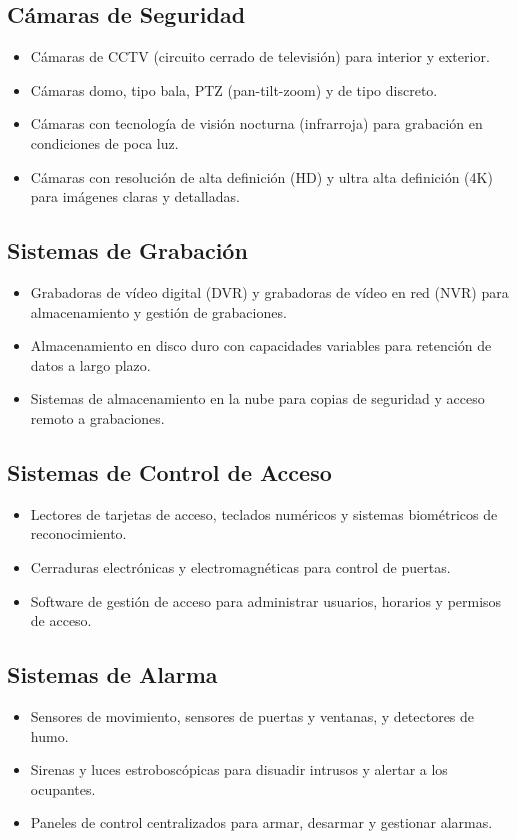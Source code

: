 \documentclass{report}
\begin{document}
          \subsection{Cámaras de Seguridad}
            \begin{itemize}
              \item Cámaras de CCTV (circuito cerrado de televisión) para interior y exterior.
              \item Cámaras domo, tipo bala, PTZ (pan-tilt-zoom) y de tipo discreto.
              \item Cámaras con tecnología de visión nocturna (infrarroja) para grabación en condiciones de poca luz.
              \item Cámaras con resolución de alta definición (HD) y ultra alta definición (4K) para imágenes claras y detalladas.
            \end{itemize}
          \subsection{Sistemas de Grabación}
            \begin{itemize}
              \item Grabadoras de vídeo digital (DVR) y grabadoras de vídeo en red (NVR) para almacenamiento y gestión de grabaciones.
              \item Almacenamiento en disco duro con capacidades variables para retención de datos a largo plazo.
              \item Sistemas de almacenamiento en la nube para copias de seguridad y acceso remoto a grabaciones.
            \end{itemize}
          \subsection{Sistemas de Control de Acceso}
            \begin{itemize}
              \item Lectores de tarjetas de acceso, teclados numéricos y sistemas biométricos de reconocimiento.
              \item Cerraduras electrónicas y electromagnéticas para control de puertas.
              \item Software de gestión de acceso para administrar usuarios, horarios y permisos de acceso.
            \end{itemize}
          \subsection{Sistemas de Alarma}
            \begin{itemize}
              \item Sensores de movimiento, sensores de puertas y ventanas, y detectores de humo.
              \item Sirenas y luces estroboscópicas para disuadir intrusos y alertar a los ocupantes.
              \item Paneles de control centralizados para armar, desarmar y gestionar alarmas.
            \end{itemize}
\end{document}
